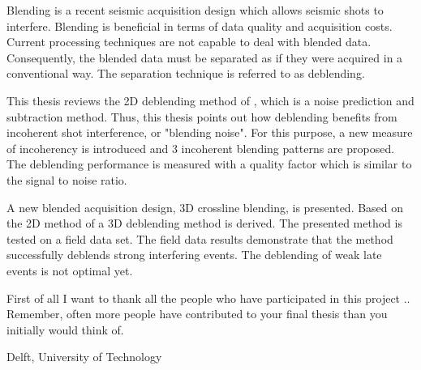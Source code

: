 \documentclass[a4paper,11pt]{mscThesis}
\begin{document}
%
\frontmatter %
%
    \maketitle
%
Blending is a recent seismic acquisition design which allows seismic shots to interfere. Blending is beneficial in terms of data quality and acquisition costs. Current processing techniques are not capable to deal with blended data. Consequently, the blended data must be separated as if they were acquired in a conventional way. The separation technique is referred to as deblending.

This thesis reviews the 2D deblending method of \citet{Mahdad-Deblending-Method}, which is a noise prediction and subtraction method. Thus, this thesis points out how deblending benefits from incoherent shot interference, or "blending noise". For this purpose, a new measure of incoherency is introduced and 3 incoherent blending patterns are proposed. The deblending performance is measured with a quality factor which is similar to the signal to noise ratio.

A new blended acquisition design, 3D crossline blending, is presented. Based on the 2D method of \citet{Mahdad-Deblending-Method} a 3D deblending method is derived. The presented method is tested on a field data set. The field data results demonstrate that the method successfully deblends strong interfering events. The deblending of weak late events is not optimal yet. 

   
    \cleardoublepage
%
    First of all I want to thank all the people who have participated in this project ..
    Remember, often more people have contributed to your final thesis than you initially would think of.
    \vspace*{15mm}

    \noindent
    Delft, University of Technology \hfill \mscname\\ %
    \mscdate

%
    \tocloflot
%
%
    \begin{acronym}%
    \end{acronym}%
    \cleardoublepage%
    
\end{document}
